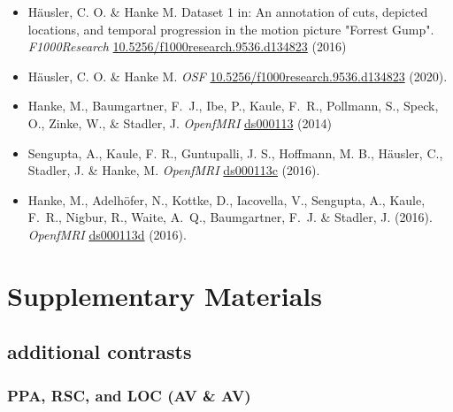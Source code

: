 \documentclass[english]{article}
\begin{document}
\begin{itemize}
\item Häusler, C. O. \& Hanke M. Dataset 1 in: An annotation of cuts, depicted
locations, and temporal progression in the motion picture "Forrest Gump".
\emph{F1000Research}
\href{https://doi.org/10.5256/f1000research.9536.d134823}{10.5256/f1000research.9536.d134823}
(2016)

\item Häusler, C. O. \& Hanke M. \emph{OSF}
\href{https://doi.org/10.17605/OSF.IO/GFRME}{10.5256/f1000research.9536.d134823}
(2020).

\item Hanke, M., Baumgartner, F.~J., Ibe, P., Kaule, F.~R., Pollmann, S., Speck, O.,
  Zinke, W., \& Stadler, J. \emph{OpenfMRI} \href{https://openfmri.org/dataset/ds000113}{ds000113} (2014)

\item Sengupta, A., Kaule, F. R., Guntupalli, J. S., Hoffmann, M. B., Häusler, C., Stadler, J. \& Hanke, M.
  \emph{OpenfMRI} \href{https://openfmri.org/dataset/ds000113c}{ds000113c} (2016).

\item Hanke, M., Adelhöfer, N., Kottke, D., Iacovella, V., Sengupta, A., Kaule, F.~R., Nigbur, R., Waite, A.~Q.,
  Baumgartner, F.~J. \& Stadler, J. (2016).
  \emph{OpenfMRI} \href{https://openfmri.org/dataset/ds000113d}{ds000113d} (2016).
\end{itemize}


\appendix

\pagebreak[4]

\setcounter{figure}{0}
\makeatletter
\renewcommand{\thefigure}{S\@arabic\c@figure}
\makeatother

\section{Supplementary Materials}


\subsection{additional contrasts}


\subsubsection{PPA, RSC, and LOC (AV \& AV)}
\end{document}
